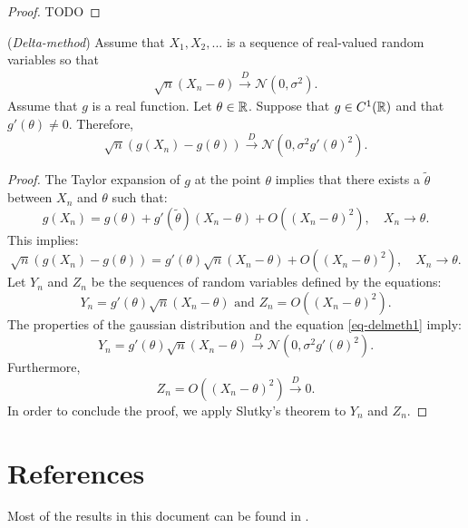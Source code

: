 \documentclass{article}
\begin{document}
\begin{proof}
TODO
\end{proof}


\begin{theorem}
(\emph{Delta-method})
Assume that $X_1,X_2,...$ is a sequence of real-valued random variables 
so that 
\begin{align}
\label{eq-delmeth1}
\sqrt{n} (X_n - \theta) \xrightarrow{D} \mathcal{N}(0,\sigma^2).
\end{align}
Assume that $g$ is a real function. 
Let $\theta\in\mathbb{R}$. 
Suppose that $g\in C^1(\mathbb{R})$ and that $g'(\theta)\neq 0$. 
Therefore, 
$$
\sqrt{n} (g(X_n) - g(\theta)) \xrightarrow{D} \mathcal{N}(0,\sigma^2 g'(\theta)^2).
$$
\end{theorem}

\begin{proof}
The Taylor expansion of $g$ at the point $\theta$ implies that there exists a $\tilde{\theta}$ between 
$X_n$ and $\theta$ such that:
$$
g(X_n) = g(\theta) + g'(\tilde{\theta})(X_n-\theta) + O((X_n-\theta)^2), \quad X_n \rightarrow \theta.
$$
This implies:
$$
\sqrt{n} (g(X_n) - g(\theta)) = g'(\theta) \sqrt{n} (X_n-\theta) + O((X_n-\theta)^2), \quad X_n \rightarrow \theta.
$$
Let $Y_n$ and $Z_n$ be the sequences of random variables defined by the equations:
$$
Y_n = g'(\theta) \sqrt{n} (X_n-\theta) \textrm{ and } Z_n = O((X_n-\theta)^2).
$$
The properties of the gaussian distribution and the equation \ref{eq-delmeth1} imply:
$$
Y_n =g'(\theta) \sqrt{n} (X_n - \theta) \xrightarrow{D} \mathcal{N}(0,\sigma^2 g'(\theta)^2).
$$
Furthermore, 
$$
Z_n = O((X_n-\theta)^2)  \xrightarrow{D} 0.
$$
In order to conclude the proof, we apply Slutky's theorem to $Y_n$ and $Z_n$. 
\end{proof}

\section{References}

Most of the results in this document can be found in \cite{Vaart2000}.

%




\end{document}
